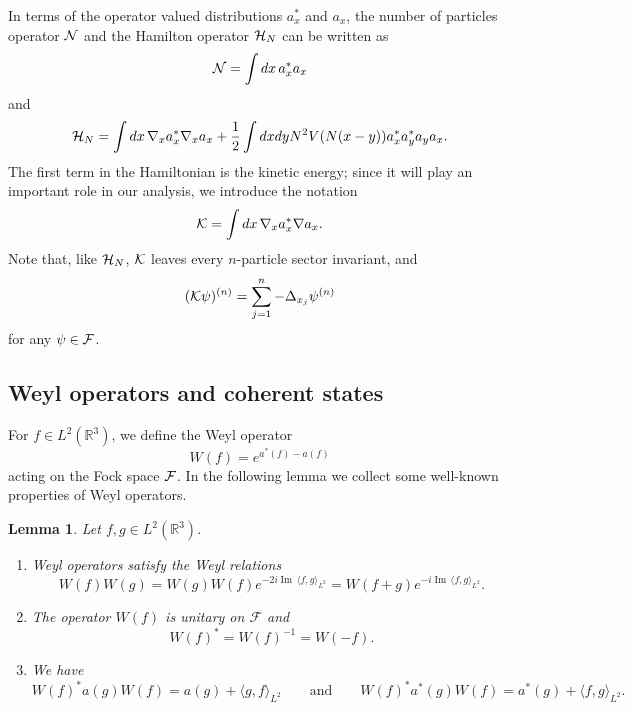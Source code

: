 \documentclass[11pt,a4paper]{article}
\newtheorem{lem}[thm]{Lemma}
\newcommand{\done}{}
\newcommand{\bR}{{\mathbb R}}
\newcommand{\cF}{{\cal F}}
\newcommand{\cK}{{\cal K}}
\newcommand{\cH}{{\cal H}}
\newcommand{\cN}{{\cal N}}
\newcommand{\R}{\mathbb{R}}
\newcommand{\fock}{\mathcal{F}}		%
\newcommand{\Ncal}{\mathcal{N}}		%
\newcommand{\scal}[2]{\big<#1,#2\big>} %
\renewcommand{\Im}{\operatorname{Im}\,} 	%
\begin{document}
In terms of the operator valued distributions $a_x^*$ and $a_x$, the number of particles operator $\cN$ 
and the Hamilton operator $\cH_N$ can be written as
\[ \cN = \int dx \, a_x^* a_x \]
and 
\begin{equation}\label{eq:ham-F} \cH_N = \int dx \, \nabla_x a_x^* \nabla_x a_x + \frac{1}{2} \int dx dy N^2 V(N (x-y)) a^*_x a^*_y a_y a_x. \end{equation}
The first term in the Hamiltonian is the kinetic energy; since it will play an important role in our analysis, we introduce the notation 
\[ \cK = \int dx \, \nabla_x a_x^* \nabla a_x. \]
Note that, like $\cH_N$, $\cK$ leaves every $n$-particle sector invariant, and
\[ (\cK \psi)^{(n)} = \sum_{j=1}^n -\Delta_{x_j} \psi^{(n)} \]
for any $\psi \in \cF$. 


\subsection{Weyl operators and coherent states}

For $f \in L^2(\R^3)$, we define the Weyl operator 
\[
  W(f) = e^{a^*(f) - a(f)}\done
\]
acting on the Fock space $\cF$. In the following lemma we collect some well-known properties of Weyl operators.
\begin{lem}\label{l:W}
  Let $f, g \in L^2(\R^3)$.
  \begin{enumerate}
    \item \label{l:W1} Weyl operators satisfy the Weyl relations
      \[
        W(f) W(g) = W(g) W(f) e^{-2i \Im \langle f, g \rangle_{L^2}} = W(f+g)
        e^{-i \Im \langle f, g \rangle_{L^2}}.
      \]
    \item \label{l:W2} The operator $W(f)$ is unitary on $\mathcal{F}$ and
      \[
        W(f)^* = W(f)^{-1} = W(-f).
      \]
    \item \label{l:W3} We have
      \begin{equation}\label{eq:W3}
        W(f)^* a (g)  W(f) = a (g) + \langle g, f \rangle_{L^2}  \qquad \text{and} \qquad W(f)^* a^* (g)
        W(f) = a^* (g) + \langle f, g \rangle_{L^2}.
      \end{equation}
 \end{enumerate}
\end{lem}
\end{document}
